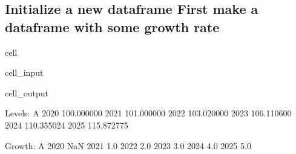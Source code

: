 \documentclass[letterpaper,10pt,english]{jupyterBook}
\begin{document}
\subsection{Initialize a new dataframe First make a dataframe with some growth rate}
\label{\detokenize{content/04_PythonEssentials/UpdateCommand:initialize-a-new-dataframe-first-make-a-dataframe-with-some-growth-rate}}
\begin{sphinxuseclass}{cell}\begin{sphinxVerbatimInput}

\begin{sphinxuseclass}{cell_input}
\begin{sphinxVerbatim}[commandchars=\\\{\}]
  
       \PYG{p}{[}    \PYG{p}{]} 
       \PYG{p}{[}\PYG{p}{]}                                 


    
\end{sphinxVerbatim}

\end{sphinxuseclass}\end{sphinxVerbatimInput}
\begin{sphinxVerbatimOutput}

\begin{sphinxuseclass}{cell_output}
\begin{sphinxVerbatim}[commandchars=\\\{\}]
Levels:
               A
2020  100.000000
2021  101.000000
2022  103.020000
2023  106.110600
2024  110.355024
2025  115.872775

Growth:
        A
2020  NaN
2021  1.0
2022  2.0
2023  3.0
2024  4.0
2025  5.0
\end{sphinxVerbatim}

\end{sphinxuseclass}\end{sphinxVerbatimOutput}

\end{sphinxuseclass}
\end{document}

